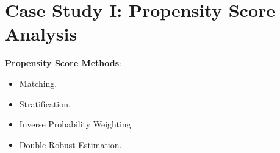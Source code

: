 \section{Case Study I: Propensity Score Analysis}
\textbf{Propensity Score Methods}:
\begin{itemize}
      \item Matching.
      \item Stratification.
      \item Inverse Probability Weighting.
      \item Double-Robust Estimation.
\end{itemize}

